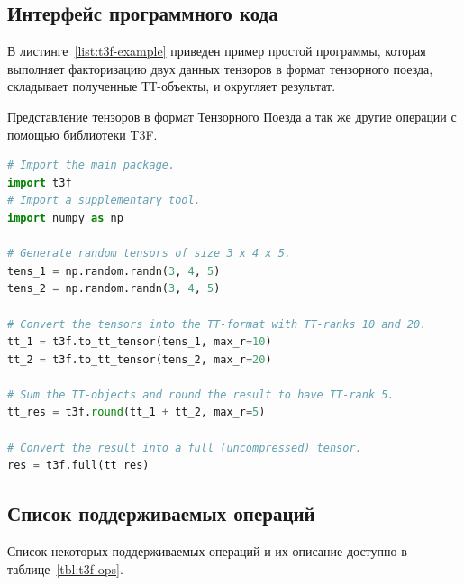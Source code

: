 \subsection{Интерфейс программного кода}
В листинге~\ref{list:t3f-example} приведен пример простой программы, которая выполняет факторизацию двух данных тензоров в формат тензорного поезда, складывает полученные ТТ-объекты, и округляет результат.
\begin{ListingEnv}[!h]%
    \caption{Представление тензоров в формат Тензорного Поезда а так же другие операции с помощью библиотеки T3F.}
    \label{list:t3f-example}
    \begin{lstlisting}[language={Python}]
# Import the main package.
import t3f
# Import a supplementary tool.
import numpy as np

# Generate random tensors of size 3 x 4 x 5.
tens_1 = np.random.randn(3, 4, 5)
tens_2 = np.random.randn(3, 4, 5)

# Convert the tensors into the TT-format with TT-ranks 10 and 20.
tt_1 = t3f.to_tt_tensor(tens_1, max_r=10)
tt_2 = t3f.to_tt_tensor(tens_2, max_r=20)

# Sum the TT-objects and round the result to have TT-rank 5.
tt_res = t3f.round(tt_1 + tt_2, max_r=5)

# Convert the result into a full (uncompressed) tensor.
res = t3f.full(tt_res)
    \end{lstlisting}
\end{ListingEnv}%

\subsection{Список поддерживаемых операций}
Список некоторых поддерживаемых операций и их описание доступно в таблице~\ref{tbl:t3f-ops}.

